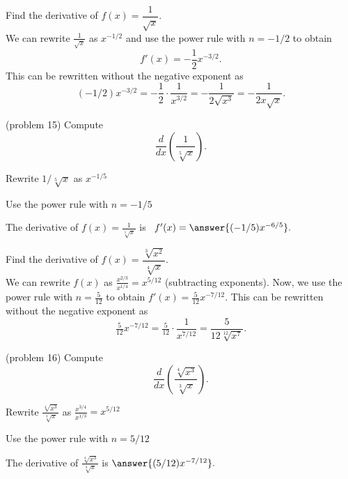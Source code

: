 \documentclass[handout]{ximera}
\begin{document}
\begin{example}[example 15]
Find the derivative of $f(x) = \dfrac{1}{\sqrt x}$.\\
We can rewrite $\frac{1}{\sqrt x}$ as $x^{-1/2}$ and use the power rule with $n = -1/2$ to obtain
\[
f'(x) = -\frac12 x^{-3/2}.
\]
This can be rewritten without the negative exponent as
\[
(-1/2)x^{-3/2}= -\frac{1}{2} \cdot \frac{1}{x^{3/2}} = -\frac{1}{2\sqrt{x^3}} = -\frac{1}{2x\sqrt x}.
\]
\end{example}




\begin{problem}(problem 15)
Compute
\[
\frac{d}{dx} \left(\frac{1}{\sqrt[5] x}\right).
\]
\begin{hint}
Rewrite $1/\sqrt[5] x$ as $x^{-1/5}$
\end{hint}
\begin{hint}
Use the power rule with $n = -1/5$
\end{hint}
The derivative of $f(x) = \frac{1}{\sqrt[5] x}$ is \ $f'(x) = \answer{(-1/5) x^{-6/5}}.$
\end{problem}




\begin{example}[example 16]
Find the derivative of $f(x) = \dfrac{\sqrt[3] {x^2}}{\sqrt[4] x}.$\\
We can rewrite $f(x)$ as $\frac{x^{2/3}}{x^{1/4}} = x^{5/12}$ 
(subtracting exponents). Now, we use the power rule with $n = \frac{5}{12}$ to obtain $f'(x) = \tfrac{5}{12}x^{-7/12}.$
This can be rewritten without the negative exponent as
\[
\tfrac{5}{12}x^{-7/12} = \tfrac{5}{12} \cdot \frac{1}{x^{7/12}} = \frac{5}{12\sqrt[12]{x^7}}.
\]
\end{example}




\begin{problem}(problem 16)
Compute
\[
\frac{d}{dx} \left(\frac{\sqrt[4] {x^3}}{\sqrt[3] x}\right).
\]
\begin{hint}
Rewrite $\frac{\sqrt[4] {x^3}}{\sqrt[3] x}$ as $\frac{x^{3/4}}{x^{1/3}} = x^{5/12}$
\end{hint}
\begin{hint}
Use the power rule with $n = 5/12$
\end{hint}
The derivative of $\frac{\sqrt[4] {x^3}}{\sqrt[3] x}$ is $\answer{(5/12) x^{-7/12}}.$
\end{problem}




\begin{center}
\begin{foldable}
\end{foldable}
\end{center}
\end{document}
